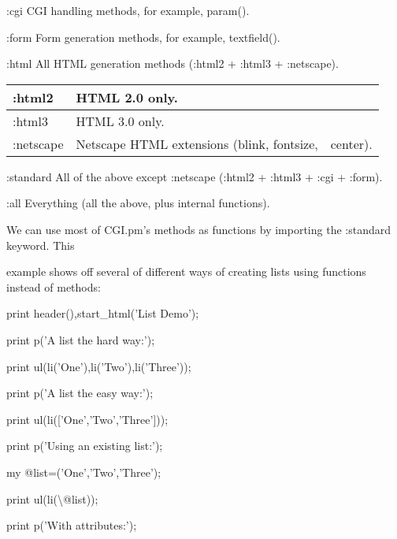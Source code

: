 \documentclass[a4paper,11pt]{book}
\begin{document}
\noindent 

\noindent :cgi CGI handling methods, for example, param().

\noindent 

\noindent :form Form generation methods, for example, textfield().

\noindent 

\noindent :html All HTML generation methods (:html2 + :html3 + :netscape).

\begin{tabular}{|p{0.9in}|p{2.2in}|p{1.1in}|} \hline 
:html2 & HTML 2.0 only. &  \\ \hline 
:html3 & HTML 3.0 only. &  \\ \hline 
:netscape & Netscape HTML extensions (blink,   fontsize, & center). \\ \hline 
\end{tabular}



\noindent :standard All of the above except :netscape (:html2 + :html3 + :cgi + :form).

\noindent 

\noindent :all Everything (all the above, plus internal functions).

\noindent 

\noindent 

\noindent We can use most of CGI.pm's methods as functions by importing the :standard keyword. This

\noindent example shows off several of different ways of creating lists using functions instead of methods:

\noindent 

\noindent 

\noindent print header(),start\_html('List Demo');

\noindent 

\noindent print p('A list the hard way:');

\noindent print ul(li('One'),li('Two'),li('Three'));

\noindent print p('A list the easy way:');

\noindent print ul(li(['One','Two','Three']));

\noindent print p('Using an existing list:');

\noindent my @list=('One','Two','Three');

\noindent print ul(li(\textbackslash @list));

\noindent print p('With attributes:');
\end{document}
